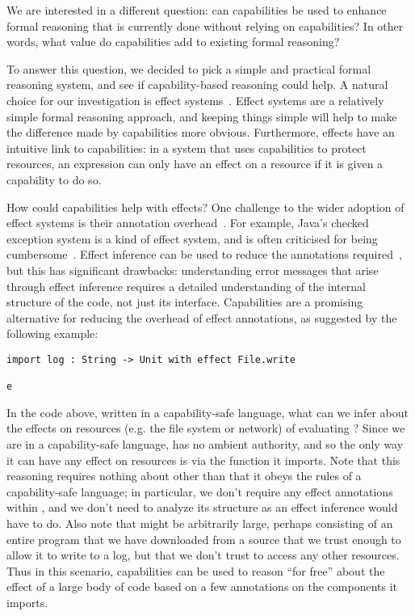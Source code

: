 We are interested in a different question: can capabilities be used to enhance formal reasoning that is currently done without relying on capabilities?
In other words, what value do capabilities add to existing formal reasoning?

To answer this question, we decided to pick a simple and practical formal reasoning system, and see if capability-based reasoning could help.
A natural choice for our investigation is effect systems~\cite{nielson99}.
Effect systems are a relatively simple formal reasoning approach, and keeping things simple will help to make the difference made by capabilities more obvious.
Furthermore, effects have an intuitive link to capabilities: in a system that uses capabilities to protect resources, an expression can only have an effect on a resource if it is given a capability to do so.

How could capabilities help with effects?
One challenge to the wider adoption of effect systems is their annotation overhead~\cite{rytz12}.
For example, Java's checked exception system is a kind of effect system, and is often criticised for being cumbersome~\cite{Kiniry2006}.
Effect inference can be used to reduce the annotations required~\cite{koka14}, but this has significant drawbacks: understanding error messages that arise through effect inference requires a detailed understanding of the internal structure of the code, not just its interface.
Capabilities are a promising alternative for reducing the overhead of effect annotations, as suggested by the following example:

\begin{lstlisting}
import log : String -> Unit with effect File.write

e
\end{lstlisting}

In the code above, written in a capability-safe language, what can we infer about the effects on resources (e.g. the file system or network) of evaluating ?
Since we are in a capability-safe language,  has no ambient authority, and so the only way it can have any effect on resources is via the  function it imports.
Note that this reasoning requires nothing about  other than that it obeys the rules of a capability-safe language; in particular, we don't require any effect annotations within , and we don't need to analyze its structure as an effect inference would have to do.
Also note that  might be arbitrarily large, perhaps consisting of an entire program that we have downloaded from a source that we trust enough to allow it to write to a log, but that we don't trust to access any other resources.
Thus in this scenario, capabilities can be used to reason ``for free'' about the effect of a large body of code based on a few annotations on the components it imports.

